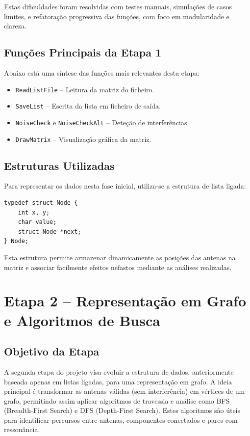 \documentclass[a4paper,12pt]{article}
\begin{document}
Estas dificuldades foram resolvidas com testes manuais, simulações de casos limites, e refatoração progressiva das funções, com foco em modularidade e clareza.

\subsection{Funções Principais da Etapa 1}
Abaixo está uma síntese das funções mais relevantes desta etapa:

\begin{itemize}
    \item \texttt{ReadListFile} – Leitura da matriz do ficheiro.
    \item \texttt{SaveList} – Escrita da lista em ficheiro de saída.
    \item \texttt{NoiseCheck} e \texttt{NoiseCheckAlt} – Deteção de interferências.
    \item \texttt{DrawMatrix} – Visualização gráfica da matriz.
\end{itemize}

\subsection{Estruturas Utilizadas}
Para representar os dados nesta fase inicial, utiliza-se a estrutura de lista ligada:

\begin{lstlisting}[style=CStyle]
typedef struct Node {
    int x, y;
    char value;
    struct Node *next;
} Node;
\end{lstlisting}

Esta estrutura permite armazenar dinamicamente as posições das antenas na matriz e associar facilmente efeitos nefastos mediante as análises realizadas.

\newpage


\section{Etapa 2 – Representação em Grafo e Algoritmos de Busca}

\subsection{Objetivo da Etapa}
A segunda etapa do projeto visa evoluir a estrutura de dados, anteriormente baseada apenas em listas ligadas, para uma representação em grafo. A ideia principal é transformar as antenas válidas (sem interferência) em vértices de um grafo, permitindo assim aplicar algoritmos de travessia e análise como BFS (Breadth-First Search) e DFS (Depth-First Search). Estes algoritmos são úteis para identificar percursos entre antenas, componentes conectados e pares com ressonância.
\end{document}

